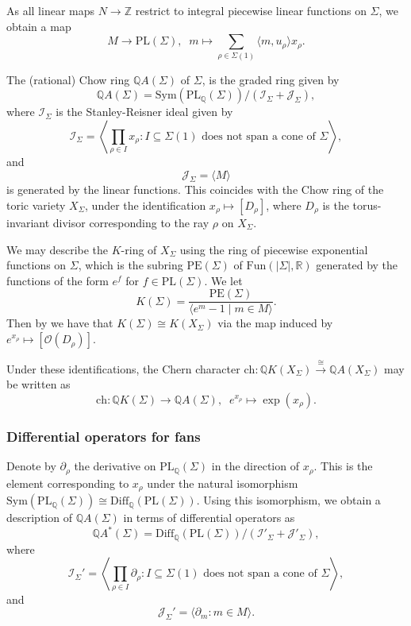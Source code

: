 \documentclass[oneside]{amsart}
\theoremstyle{plain}
\theoremstyle{definition}
\newcommand{\R}{{\mathbb{R}}}
\newcommand{\Z}{{\mathbb{Z}}}
\newcommand{\Q}{{\mathbb{Q}}}
\newcommand{\cO}{{\mathcal{O}}}
\newcommand{\Fun}{{\mathrm{Fun}}}
\newcommand{\Diff}{{\mathrm{Diff}}}
\newcommand{\Sym}{{\mathrm{Sym}}}
\newcommand{\ch}{{\mathrm{ch}}}
\newcommand{\PL}{{\mathrm{PL}}}
\newcommand{\PE}{{\mathrm{PE}}}
\newcommand{\mc}[1]{{\mathcal{#1}}}
\begin{document}
As all linear maps $N \to \Z$ restrict to integral piecewise linear functions on $\Sigma$, we obtain a map
\[
M\to \PL(\Sigma),\;\; m\mapsto \sum_{\rho\in\Sigma(1)} \langle m,u_\rho\rangle x_\rho.
\]

The (rational) Chow ring $\Q A(\Sigma)$ of $\Sigma$,
is the graded ring given by
\[
    \Q A(\Sigma)=\Sym(\PL_\Q(\Sigma))/(\mc I_\Sigma +\mc J_\Sigma),
\]
where $\mc I_\Sigma$ is the Stanley-Reisner ideal given by
\[
    \mc I_\Sigma =\left\langle \prod_{\rho\in I} x_\rho : I\subseteq \Sigma(1) \text{ does not span a cone of }\Sigma \right\rangle,
\]
and 
\[
    \mc J_\Sigma =\langle M\rangle   
\]
is generated by the linear functions.
This coincides with the Chow ring of the toric variety $X_\Sigma$, under the identification
$x_\rho \mapsto [D_\rho]$, where $D_\rho$ is the torus-invariant divisor corresponding to the ray $\rho$ on $X_\Sigma$.

We may describe the $K$-ring of $X_\Sigma$ using the ring of piecewise exponential functions on $\Sigma$, which is the subring $\PE(\Sigma)$
of $\Fun(|\Sigma|, \R)$ generated by the functions of the form $e^f$ for $f \in \PL(\Sigma)$.
We let
\[
    K(\Sigma) = \frac{\PE(\Sigma)}{\langle e^m - 1 \mid m \in M\rangle}.
\]
Then by \cite{Brion1997, Merkurjev1997} we have that $K(\Sigma) \cong K(X_\Sigma)$ via the map induced by $e^{x_\rho} \mapsto [\cO(D_\rho)]$. 

Under these identifications, the
Chern character  $\ch\colon \Q K(X_\Sigma)\xrightarrow{\cong} \Q A(X_\Sigma)$ may be written as
\[
    \ch\colon \Q K(\Sigma) \to \Q A(\Sigma), \;\; e^{x_\rho} \mapsto \exp(x_\rho).
\]


\subsubsection{Differential operators for fans}

Denote by $\partial_\rho$ the derivative on $\PL_\Q(\Sigma)$ in the direction of $x_\rho$. This is the element corresponding to $x_\rho$ under the natural isomorphism $\Sym(\PL_\Q(\Sigma))\cong \Diff_\Q(\PL(\Sigma))$. Using this isomorphism, we obtain a description of $\Q A(\Sigma)$ in terms of differential operators as
\[
\Q A^*(\Sigma)=\Diff_\Q(\PL(\Sigma))/(\mc I'_\Sigma+\mc J'_\Sigma), 
\]
where 
\[
    \mathcal I_\Sigma' =\left\langle \prod_{\rho\in I} \partial_\rho : I\subseteq \Sigma(1) \text{ does not span a cone of }\Sigma \right\rangle ,
\]
and 
\[
    \mathcal J_\Sigma' =\langle \partial_m : m\in M\rangle.
\]
\end{document}

